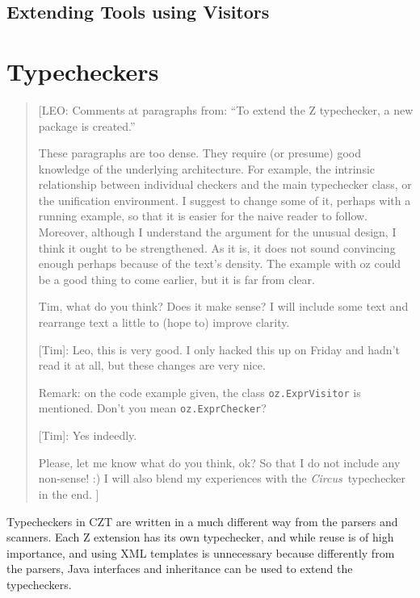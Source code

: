 \documentclass{llncs}
\newcommand{\Circus}{{\sf\slshape Circus}}
\begin{document}
\subsection{Extending Tools using Visitors}
\label{extending-visitors}


\section{Typecheckers}
\label{typecheckers}

\begin{quotation}
[LEO: Comments at paragraphs from: ``To extend the Z typechecker,
      a new package is created.''

      \vspace{5pt}

      These paragraphs are too dense. They require (or presume) good knowledge of
      the underlying architecture. For example, the intrinsic relationship between
      individual checkers and the main typechecker class, or the unification environment.
      I suggest to change some of it, perhaps with a running example, so that it is easier
      for the naive reader to follow.
      Moreover, although I understand the argument for the unusual design,
      I think it ought to be strengthened. As it is, it does not sound convincing
      enough perhaps because of the text's density. The example with oz could be
      a good thing to come earlier, but it is far from clear.

      \vspace{5pt}

      Tim, what do you think? Does it make sense?
      I will include some text and rearrange text a little to (hope
      to) improve clarity.

      [Tim]: Leo, this is very good. I only hacked this up on Friday
      and hadn't read it at all, but these changes are very nice.

      Remark: on the code example given, the class {\tt oz.ExprVisitor} is mentioned.
      Don't you mean {\tt oz.ExprChecker}?

     [Tim]: Yes indeedly.

      Please, let me know what do you think, ok? So that I do not include any non-sense! :)
      I will also blend my experiences with the \Circus\ typechecker in the end.
      ]
\end{quotation}

Typecheckers in CZT are written in a much different way from the parsers
and scanners. Each Z extension has its own typechecker, and while reuse
is of high importance, and using XML templates is unnecessary because
differently from the parsers, Java interfaces and inheritance can be used to
extend the typecheckers.
\end{document}
